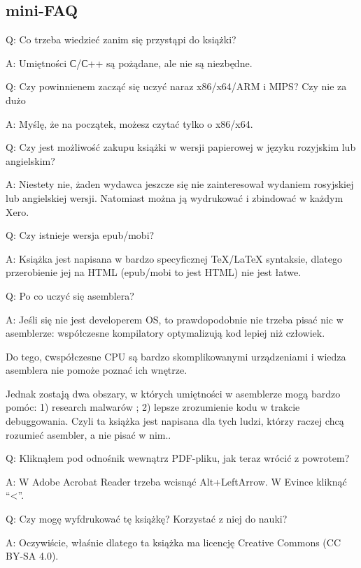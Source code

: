 \subsection*{mini-FAQ}

\par Q: Co trzeba wiedzieć zanim się przystąpi do książki?
\par A: Umiętności С/С++ są pożądane, ale nie są niezbędne.

\par Q: Czy powinnienem zacząć się uczyć naraz x86/x64/ARM i MIPS? Czy nie za dużo
\par A: Myślę, że na początek, możesz czytać tylko o x86/x64.

\par Q: Czy jest możliwość zakupu książki w wersji papierowej w języku rozyjskim lub angielskim?
\par A: Niestety nie, żaden wydawca jeszcze się nie zainteresował wydaniem rosyjskiej lub angielskiej wersji. Natomiast można ją wydrukować i zbindować w każdym Xero.

\par Q: Czy istnieje wersja epub/mobi?
\par A: Książka jest napisana w bardzo specyficznej TeX/LaTeX syntaksie, dlatego przerobienie jej na HTML (epub/mobi to jest HTML)
nie jest łatwe.

\par Q: Po co uczyć się asemblera?
\par A: Jeśli się nie jest developerem \ac{OS}, to prawdopodobnie nie trzeba pisać nic w asemblerze: współczesne kompilatory optymalizują kod lepiej niż człowiek.

Do tego, сwspółczesne \ac{CPU} są bardzo skomplikowanymi urządzeniami i wiedza asemblera nie pomoże poznać ich wnętrze.

Jednak zostają dwa obszary, w których umiętności w asemblerze mogą bardzo pomóc:
1) research malwarów ; 2) lepsze zrozumienie kodu w trakcie debuggowania.
Czyli ta książka jest napisana dla tych ludzi, którzy raczej chcą rozumieć asembler, a nie pisać w nim..

\par Q: Kliknąłem pod odnośnik wewnątrz PDF-pliku, jak teraz wrócić z powrotem?
\par A: W Adobe Acrobat Reader trzeba wcisnąć Alt+LeftArrow. W Evince kliknąć ``<''.

\par Q: Czy mogę wyfdrukować tę książkę? Korzystać z niej do nauki?
\par A: Oczywiście, właśnie dlatego ta książka ma licencję Creative Commons (CC BY-SA 4.0).

